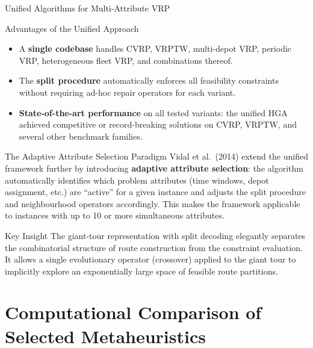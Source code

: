 \documentclass[aspectratio=169,10pt]{beamer}
\begin{document}
\begin{frame}[allowframebreaks]{Unified Algorithms for Multi-Attribute VRP}
  \begin{block}{Advantages of the Unified Approach}
    \begin{itemize}
      \item A \textbf{single codebase} handles CVRP, VRPTW, multi-depot
            VRP, periodic VRP, heterogeneous fleet VRP, and combinations
            thereof.
      \item The \textbf{split procedure} automatically enforces all
            feasibility constraints without requiring ad-hoc repair
            operators for each variant.
      \item \textbf{State-of-the-art performance} on all tested variants:
            the unified HGA achieved competitive or record-breaking
            solutions on CVRP, VRPTW, and several other benchmark
            families.
    \end{itemize}
  \end{block}

  \begin{block}{The Adaptive Attribute Selection Paradigm}
    Vidal et al.\ (2014) extend the unified framework further by
    introducing \textbf{adaptive attribute selection}: the algorithm
    automatically identifies which problem attributes (time windows,
    depot assignment, etc.) are ``active'' for a given instance and
    adjusts the split procedure and neighbourhood operators accordingly.
    This makes the framework applicable to instances with up to 10 or
    more simultaneous attributes.
  \end{block}

  \begin{alertblock}{Key Insight}
    The giant-tour representation with split decoding elegantly separates
    the combinatorial structure of route construction from the constraint
    evaluation.  It allows a single evolutionary operator (crossover)
    applied to the giant tour to implicitly explore an exponentially
    large space of feasible route partitions.
  \end{alertblock}

\end{frame}

\section{Computational Comparison of Selected Metaheuristics}
\end{document}
